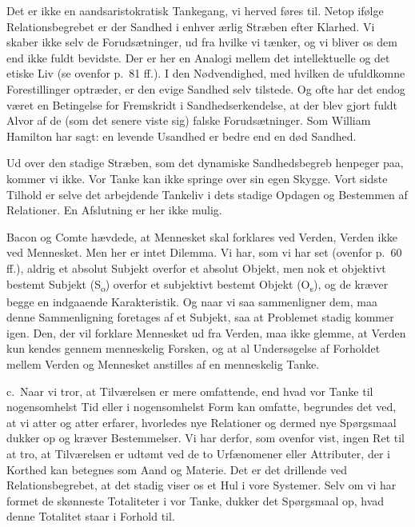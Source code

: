 \documentclass[12pt]{article}
\newcommand{\opage}[1]{\marginnote{\footnotesize\textit{[#1]}}}
\begin{document}
Det er ikke en aandsaristokratisk Tankegang, vi herved føres til. Netop
ifølge Relationsbegrebet er der Sandhed i enhver ærlig Stræben efter
Klarhed. Vi skaber ikke selv de Forudsætninger, ud fra hvilke vi tænker, og
vi
\opage{105} bliver os dem end ikke fuldt bevidste. Der er her en Analogi mellem det
intellektuelle og det etiske Liv (se ovenfor p.~81 ff.). I den
Nødvendighed, med hvilken de \guillemotright
ufuldkomne\guillemotleft{} Forestillinger optræder, er den evige Sandhed
selv tilstede. Og ofte har det endog været en Betingelse for Fremskridt i
Sandhedserkendelse, at der blev gjort fuldt Alvor af de (som det senere
viste sig) falske Forudsætninger. Som William Hamilton har sagt: en levende
Usandhed er bedre end en død Sandhed.

Ud over den stadige Stræben, som det dynamiske Sandhedsbegreb henpeger paa,
kommer vi ikke. Vor Tanke kan ikke springe over sin egen Skygge. Vort
sidste Tilhold er selve det arbejdende Tankeliv i dets stadige Opdagen og
Bestemmen af Relationer. En Afslutning er her ikke mulig.

Bacon og Comte hævdede, at Mennesket skal forklares ved Verden, Verden ikke
ved Mennesket. Men her er intet Dilemma. Vi har, som vi har set (ovenfor
p.~60 ff.), aldrig et absolut Subjekt overfor et absolut Objekt, men nok et
objektivt bestemt Subjekt (S\textsubscript{o}) overfor et subjektivt
bestemt Objekt (O\textsubscript{s}), og de kræver begge en indgaaende
Karakteristik. Og naar vi saa sammenligner dem, maa denne Sammenligning
foretages af et Subjekt, saa at Problemet stadig kommer igen. Den, der vil
forklare Mennesket ud fra Verden, maa ikke glemme, at Verden kun kendes
gennem menneskelig Forsken, og at al Undersøgelse af Forholdet mellem
Verden og Mennesket anstilles af en menneskelig Tanke.

c.~Naar vi tror, at Tilværelsen er mere omfattende, end hvad vor Tanke til
nogensomhelst Tid eller i nogensomhelst Form kan omfatte, begrundes det
ved, at vi atter og atter erfarer, hvorledes nye Relationer og dermed nye
Spørgsmaal dukker op og kræver Bestemmelser. Vi har
\opage{106} derfor, som ovenfor vist, ingen Ret til at tro, at Tilværelsen er udtømt
ved de to Urfænomener eller Attributer, der i Korthed kan betegnes som Aand
og Materie. Det er det drillende ved Relationsbegrebet, at det stadig viser
os et Hul i vore Systemer. Selv om vi har formet de skønneste Totaliteter i
vor Tanke, dukker det Spørgsmaal op, hvad denne Totalitet staar i Forhold
til.
\end{document}
